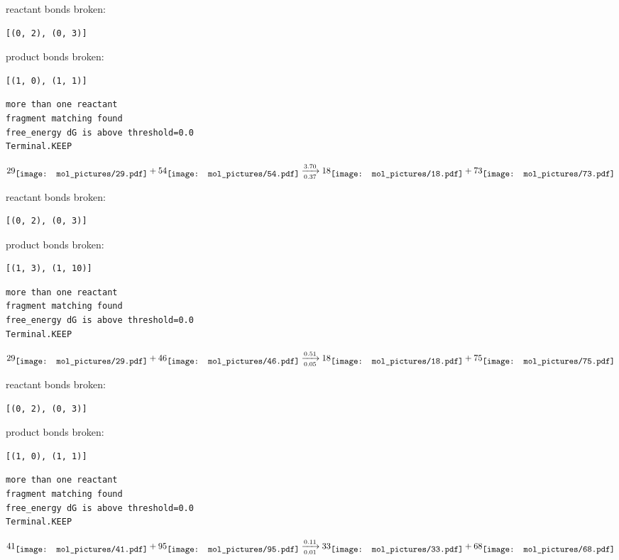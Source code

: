 \documentclass{article}
\begin{document}
reactant bonds broken:\begin{verbatim}
[(0, 2), (0, 3)]
\end{verbatim}
product bonds broken:\begin{verbatim}
[(1, 0), (1, 1)]
\end{verbatim}




\vspace{1cm}
\begin{verbatim}
more than one reactant
fragment matching found
free_energy dG is above threshold=0.0
Terminal.KEEP
\end{verbatim}
$$
29
\raisebox{-.5\height}{\texttt{[image: mol\_pictures/29.pdf]}}
+
54
\raisebox{-.5\height}{\texttt{[image: mol\_pictures/54.pdf]}}
\xrightarrow[0.37]{3.70}
18
\raisebox{-.5\height}{\texttt{[image: mol\_pictures/18.pdf]}}
+
73
\raisebox{-.5\height}{\texttt{[image: mol\_pictures/73.pdf]}}
$$


reactant bonds broken:\begin{verbatim}
[(0, 2), (0, 3)]
\end{verbatim}
product bonds broken:\begin{verbatim}
[(1, 3), (1, 10)]
\end{verbatim}




\vspace{1cm}
\begin{verbatim}
more than one reactant
fragment matching found
free_energy dG is above threshold=0.0
Terminal.KEEP
\end{verbatim}
$$
29
\raisebox{-.5\height}{\texttt{[image: mol\_pictures/29.pdf]}}
+
46
\raisebox{-.5\height}{\texttt{[image: mol\_pictures/46.pdf]}}
\xrightarrow[0.05]{0.51}
18
\raisebox{-.5\height}{\texttt{[image: mol\_pictures/18.pdf]}}
+
75
\raisebox{-.5\height}{\texttt{[image: mol\_pictures/75.pdf]}}
$$


reactant bonds broken:\begin{verbatim}
[(0, 2), (0, 3)]
\end{verbatim}
product bonds broken:\begin{verbatim}
[(1, 0), (1, 1)]
\end{verbatim}




\vspace{1cm}
\begin{verbatim}
more than one reactant
fragment matching found
free_energy dG is above threshold=0.0
Terminal.KEEP
\end{verbatim}
$$
41
\raisebox{-.5\height}{\texttt{[image: mol\_pictures/41.pdf]}}
+
95
\raisebox{-.5\height}{\texttt{[image: mol\_pictures/95.pdf]}}
\xrightarrow[0.01]{0.11}
33
\raisebox{-.5\height}{\texttt{[image: mol\_pictures/33.pdf]}}
+
68
\raisebox{-.5\height}{\texttt{[image: mol\_pictures/68.pdf]}}
$$
\end{document}
